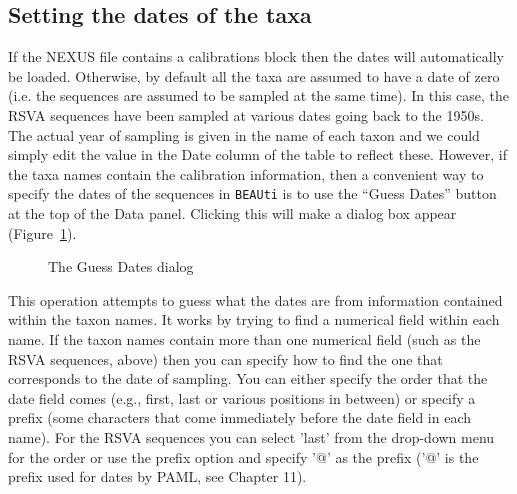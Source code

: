 \documentclass[cup7b, english]{cupbook}
\begin{document}
\subsection{Setting the dates of the taxa}

If the NEXUS file contains a calibrations block then the dates will automatically be loaded. Otherwise, by default
all the taxa are assumed to have a date of zero (i.e. the sequences are assumed to be sampled at the same time).
In this case, the RSVA sequences have been sampled at various dates going back to the 1950s. The actual year of
sampling is given in the name of each taxon and we could simply edit the value in the Date column of the table to
reflect these. However, if the taxa names contain the calibration information, then a convenient way to specify
the dates of the sequences in \texttt{BEAUti} is to use the ``Guess Dates'' button at the top of the Data panel. Clicking this
will make a dialog box appear (Figure~\ref{fig:figure2}).

\begin{figure}[htbp]
\begin{center}
\leavevmode
{}
\end{center}
\caption{The Guess Dates dialog}
\label{fig:figure2}
\end{figure}

This operation attempts to guess what the dates are from information contained within the taxon names.
It works by trying to find a numerical field within each name. If the taxon names contain more than one
numerical field (such as the RSVA sequences, above) then you can specify how to find the one that
corresponds to the date of sampling. You can either specify the order that the date field comes (e.g.,
first, last or various positions in between) or specify a prefix (some characters that come immediately
before the date field in each name). For the RSVA sequences you can select 'last' from the drop-down menu
for the order or use the prefix option and specify '@' as the prefix ('@' is the prefix used for dates by PAML, see Chapter 11).
\end{document}
